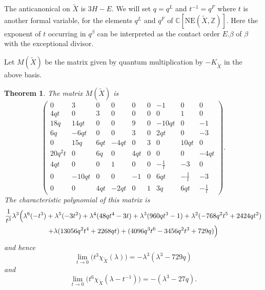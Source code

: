 \documentclass[11pt]{amsart}
\theoremstyle{plain}
\newtheorem{theorem}{Theorem}[section]
\numberwithin{equation}{section}
\theoremstyle{definition}
\theoremstyle{remark}
\newcommand{\Z}{\mathbb Z}
\newcommand{\C}{\mathbb C}
\begin{document}
The anticanonical on $\widetilde{X}$ is $3H-E$. We will set $q=q^L$ and $t^{-1} = q^F$ where $t$ is another formal variable, for the elements $q^L$ and $q^F$ of $\C [ \mathrm{NE}(\widetilde{X}, \Z ) ]$. Here the exponent of $t$ occurring in $q^{\beta}$ can be interpreted as the contact order $E.\beta$ of $\beta$ with the exceptional divisor. 

Let $M(\widetilde{X})$ be the matrix given by quantum multiplication by $-K_{\widetilde{X}}$ in the above basis.

\begin{theorem}\label{t:FullMatrixBlowup}
The matrix $M(\widetilde{X})$ is 
\[
\left(\!\begin{array}{cccccc|ccc}
       0&3&0&0&0&0&-1&0&0\\
       4qt&0&3&0&0&0&0&1&0\\
       18q&14qt&0&0&9&0&-10qt&0&-1\\
       6q&-6qt&0&0&3&0&2qt&0&-3\\
       0&15q&6qt&-4qt&0&3&0&10qt&0\\
       20q^{2}t&0&6q&0&4qt&0&0&0&-4qt\\ \hline
       4qt&0&0&1&0&0&-\frac{1}{t}&-3&0\\
       0&-10qt&0&0&-1&0&6qt&-\frac{1}{t}&-3\\
       0&0&4qt&-2qt&0&1&3q&6qt&-\frac{1}{t}
       \end{array}\!\right).
\]
The characteristic polynomial of this matrix is
\normalsize
\begin{gather*}
\frac{1}{t^{3}}\lambda^3\Bigl(\lambda^{6}(-t^{3})
+\lambda^{5}(-3t^{2})
+\lambda^{4}(48qt^{4}-3t)
+\lambda^{3}(960qt^{3}-1) 
+\lambda^{2}(-768q^{2}t^{5}+2424qt^{2}) \\
+\lambda(13056q^{2}t^{4}+2268qt)
+(4096q^{3}t^{6}-3456q^{2}t^{3}+729q)\Bigr)
\end{gather*}
and hence
\[
\lim_{t\to 0} \bigl( t^3 \chi_{\widetilde{X}}(\lambda) \bigr) = -\lambda^3(\lambda^3-729q)
\]
and
\[
\lim_{t\to 0} \bigl( t^6 \chi_{\widetilde{X}} (\lambda - t^{-1}) \bigr) = -(\lambda^3-27q).
\]
\end{theorem}
\end{document}
